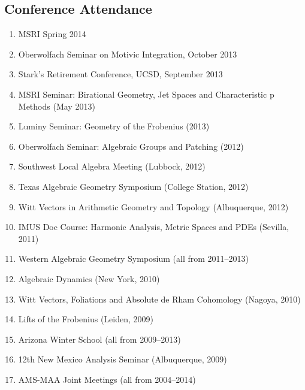 \documentclass[a4paper,10pt]{article}
\begin{document}
\subsection*{Conference Attendance }
\begin{enumerate}
\item MSRI Spring 2014
\item Oberwolfach Seminar on Motivic Integration, October 2013
\item Stark's Retirement Conference, UCSD, September 2013
\item MSRI Seminar: Birational Geometry, Jet Spaces and  Characteristic p Methods (May 2013)
\item  Luminy Seminar: Geometry of the Frobenius (2013)
 \item Oberwolfach Seminar: Algebraic Groups and Patching (2012)
 \item Southwest Local Algebra Meeting (Lubbock, 2012)
 \item Texas Algebraic Geometry Symposium (College Station, 2012)
 \item Witt Vectors in Arithmetic Geometry and Topology (Albuquerque, 2012)
 \item IMUS Doc Course: Harmonic Analysis, Metric Spaces and PDEs (Sevilla, 2011)
 \item Western Algebraic Geometry Symposium (all from 2011--2013)
 \item Algebraic Dynamics (New York, 2010)
 \item Witt Vectors, Foliations and Absolute de Rham Cohomology (Nagoya, 2010)
 \item Lifts of the Frobenius (Leiden, 2009)
 \item Arizona Winter School (all from 2009--2013)
 \item 12th New Mexico Analysis Seminar (Albuquerque, 2009)
 \item AMS-MAA Joint Meetings (all from 2004--2014)
\end{enumerate}
\fi



\newpage 
\end{document}
